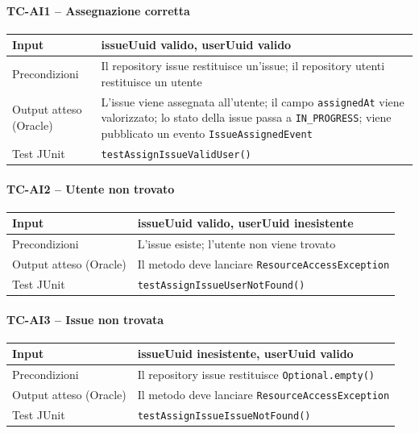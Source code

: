 \documentclass[a4paper,12pt]{article}
\begin{document}
\paragraph{TC-AI1 -- Assegnazione corretta}
\label{sec:TC-AI1}
\begin{longtable}{|p{4cm}|p{10.3cm}|}
\hline
Input & issueUuid valido, userUuid valido \\ \hline
Precondizioni & Il repository issue restituisce un'issue; il repository utenti restituisce un utente \\ \hline
Output atteso (Oracle) & L'issue viene assegnata all'utente; il campo \texttt{assignedAt} viene valorizzato; lo stato della issue passa a \texttt{IN\_PROGRESS}; viene pubblicato un evento \texttt{IssueAssignedEvent} \\ \hline
Test JUnit & \texttt{testAssignIssueValidUser()} \\ \hline
\end{longtable}

\paragraph{TC-AI2 -- Utente non trovato}
\label{sec:TC-AI2}
\begin{longtable}{|p{4cm}|p{10.3cm}|}
\hline
Input & issueUuid valido, userUuid inesistente \\ \hline
Precondizioni & L'issue esiste; l'utente non viene trovato \\ \hline
Output atteso (Oracle) & Il metodo deve lanciare \texttt{ResourceAccessException} \\ \hline
Test JUnit & \texttt{testAssignIssueUserNotFound()} \\ \hline
\end{longtable}

\paragraph{TC-AI3 -- Issue non trovata}
\label{sec:TC-AI3}
\begin{longtable}{|p{4cm}|p{10.3cm}|}
\hline
Input & issueUuid inesistente, userUuid valido \\ \hline
Precondizioni & Il repository issue restituisce \texttt{Optional.empty()} \\ \hline
Output atteso (Oracle) & Il metodo deve lanciare \texttt{ResourceAccessException} \\ \hline
Test JUnit & \texttt{testAssignIssueIssueNotFound()} \\ \hline
\end{longtable}
\end{document}

